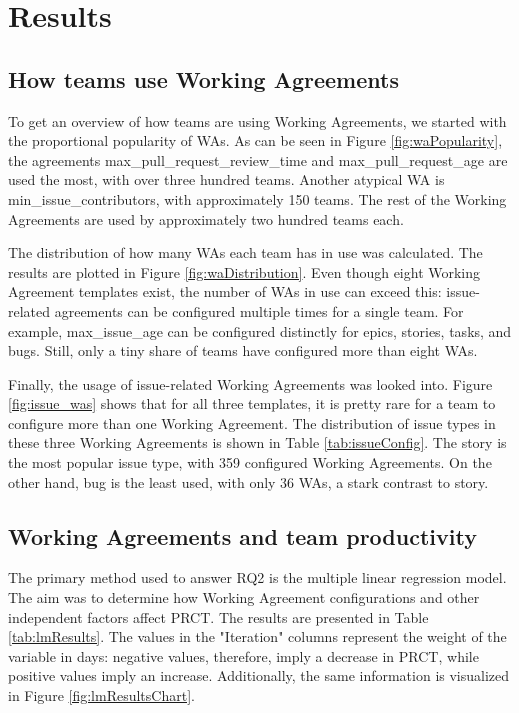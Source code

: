 
\chapter{Results}

\section{How teams use Working Agreements}


To get an overview of how teams are using Working Agreements, we started with the proportional popularity of WAs. As can be seen in Figure \ref{fig:waPopularity}, the agreements max\_pull\_request\_review\_time and max\_pull\_request\_age are used the most, with over three hundred teams. Another atypical WA is min\_issue\_contributors, with approximately 150 teams. The rest of the Working Agreements are used by approximately two hundred teams each.



The distribution of how many WAs each team has in use was calculated. The results are plotted in Figure \ref{fig:waDistribution}. Even though eight Working Agreement templates exist, the number of WAs in use can exceed this: issue-related agreements can be configured multiple times for a single team. For example, max\_issue\_age can be configured distinctly for epics, stories, tasks, and bugs. Still, only a tiny share of teams have configured more than eight WAs.



Finally, the usage of issue-related Working Agreements was looked into. Figure \ref{fig:issue_was} shows that for all three templates, it is pretty rare for a team to configure more than one Working Agreement. The distribution of issue types in these three Working Agreements is shown in Table \ref{tab:issueConfig}. The story is the most popular issue type, with 359 configured Working Agreements. On the other hand, bug is the least used, with only 36 WAs, a stark contrast to story.





\section{Working Agreements and team productivity}

The primary method used to answer RQ2 is the multiple linear regression model. The aim was to determine how Working Agreement configurations and other independent factors affect PRCT. The results are presented in Table \ref{tab:lmResults}. The values in the "Iteration" columns represent the weight of the variable in days: negative values, therefore, imply a decrease in PRCT, while positive values imply an increase. Additionally, the same information is visualized in Figure \ref{fig:lmResultsChart}. 

